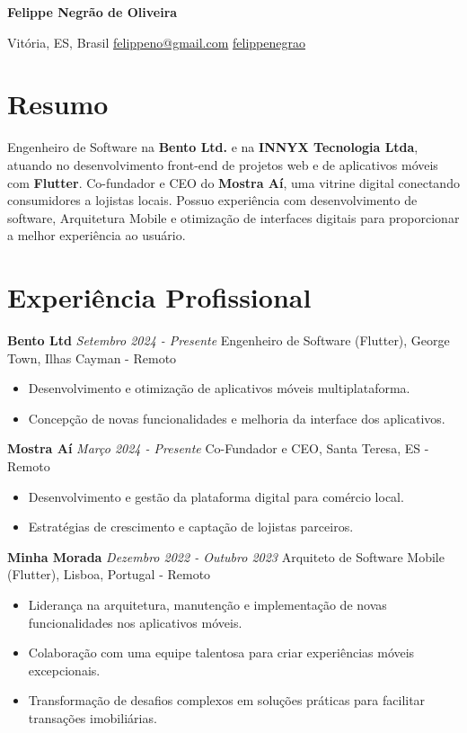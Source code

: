 \documentclass[10pt, letterpaper]{article}
\begin{document}
\begin{center}
    {\fontsize{30 pt}{30 pt} \textbf{Felippe Negrão de Oliveira}}
    
    \vspace{0.3 cm}
    
    {Vitória, ES, Brasil \quad \faEnvelope[regular] \href{mailto:felippeno@gmail.com}{felippeno@gmail.com} \quad \faLinkedin \href{https://linkedin.com/in/felippenegrao}{felippenegrao}} 
\end{center}

\section{Resumo}
Engenheiro de Software na \textbf{Bento Ltd.} e na \textbf{INNYX Tecnologia Ltda}, atuando no desenvolvimento front-end de projetos web e de aplicativos móveis com \textbf{Flutter}. Co-fundador e CEO do \textbf{Mostra Aí}, uma vitrine digital conectando consumidores a lojistas locais. Possuo experiência com desenvolvimento de software, Arquitetura Mobile e otimização de interfaces digitais para proporcionar a melhor experiência ao usuário.


\section{Experiência Profissional}
\textbf{Bento Ltd} \hfill \textit{Setembro 2024 - Presente}\newline
Engenheiro de Software (Flutter), George Town, Ilhas Cayman  - Remoto
\begin{itemize}
    \item Desenvolvimento e otimização de aplicativos móveis multiplataforma.
    \item Concepção de novas funcionalidades e melhoria da interface dos aplicativos.
\end{itemize}

\textbf{Mostra Aí} \hfill \textit{Março 2024 - Presente}\newline
Co-Fundador e CEO, Santa Teresa, ES  - Remoto
\begin{itemize}
    \item Desenvolvimento e gestão da plataforma digital para comércio local.
    \item Estratégias de crescimento e captação de lojistas parceiros.
\end{itemize}

\textbf{Minha Morada} \hfill \textit{Dezembro 2022 - Outubro 2023}\newline
Arquiteto de Software Mobile (Flutter), Lisboa, Portugal - Remoto
\begin{itemize}
    \item Liderança na arquitetura, manutenção e implementação de novas funcionalidades nos aplicativos móveis.
    \item Colaboração com uma equipe talentosa para criar experiências móveis excepcionais.
    \item Transformação de desafios complexos em soluções práticas para facilitar transações imobiliárias.
\end{itemize}
\end{document}
